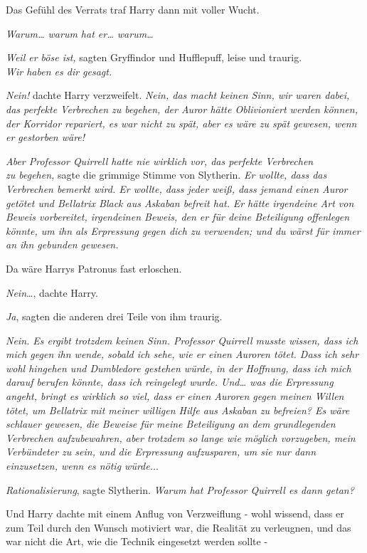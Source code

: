 {Das Gefühl des Verrats traf Harry dann mit voller Wucht.

\emph{Warum… warum hat er… warum…}

\emph{Weil er böse ist,} sagten Gryffindor und Hufflepuff, leise und traurig.\\ \emph{Wir haben es dir gesagt.}

\emph{Nein!} dachte Harry verzweifelt. \emph{Nein, das macht keinen Sinn, wir waren dabei, das perfekte Verbrechen zu begehen, der Auror hätte Oblivioniert werden können, der Korridor repariert, es war nicht zu spät, aber es wäre zu spät gewesen, wenn er gestorben wäre!}

\emph{Aber Professor Quirrell hatte nie wirklich vor, das perfekte Verbrechen}\\ \emph{zu begehen,} sagte die grimmige Stimme von Slytherin. \emph{Er wollte, dass das Verbrechen bemerkt wird. Er wollte, dass jeder weiß, dass jemand einen Auror getötet und Bellatrix Black aus Askaban befreit hat.} \emph{Er hätte irgendeine Art von} \emph{Beweis vorbereitet, irgendeinen Beweis, den er für deine Beteiligung offenlegen könnte, um ihn als Erpressung gegen dich zu verwenden; und du wärst für immer an ihn gebunden gewesen.}

Da wäre Harrys Patronus fast erloschen.

\emph{Nein}…, dachte Harry.

\emph{Ja}, sagten die anderen drei Teile von ihm traurig.

\emph{Nein. Es ergibt trotzdem keinen Sinn. Professor Quirrell musste wissen, dass ich mich gegen ihn wende, sobald ich sehe, wie er einen Auroren tötet. Dass ich sehr wohl hingehen und Dumbledore gestehen würde, in der Hoffnung, dass ich mich darauf berufen könnte, dass ich reingelegt wurde. Und… was die Erpressung angeht, bringt es wirklich so viel, dass er einen Auroren gegen meinen Willen tötet, um Bellatrix mit meiner willigen Hilfe aus Askaban zu befreien? Es wäre schlauer gewesen, die Beweise für meine Beteiligung an dem grundlegenden Verbrechen aufzubewahren, aber trotzdem so lange wie möglich vorzugeben, mein Verbündeter zu sein, und die Erpressung aufzusparen, um sie nur dann einzusetzen, wenn es nötig würde.}..

\emph{Rationalisierung}, sagte Slytherin. \emph{Warum hat Professor Quirrell es dann getan?}

Und Harry dachte mit einem Anflug von Verzweiflung - wohl wissend, dass er zum Teil durch den Wunsch motiviert war, die Realität zu verleugnen, und das war nicht die Art, wie die Technik eingesetzt werden sollte -

}
